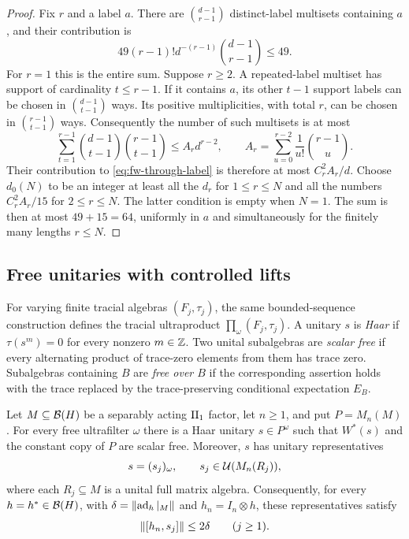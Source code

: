 \begin{proof}
Fix $r$ and a label $a$.  There are $\binom{d-1}{r-1}$ distinct-label
multisets containing $a$, and their contribution is
\[
 49(r-1)!d^{-(r-1)}\binom{d-1}{r-1}\leq49.
\]
For $r=1$ this is the entire sum.  Suppose $r\geq2$.  A repeated-label
multiset has support of cardinality $t\leq r-1$.  If it contains
$a$, its other $t-1$ support labels can be chosen in
$\binom{d-1}{t-1}$ ways.  Its positive multiplicities, with total
$r$, can be chosen in $\binom{r-1}{t-1}$ ways.  Consequently the
number of such multisets is at most
\[
 \sum_{t=1}^{r-1}\binom{d-1}{t-1}\binom{r-1}{t-1}
 \leq A_r d^{r-2},
 \qquad
 A_r=\sum_{u=0}^{r-2}\frac1{u!}\binom{r-1}{u}.
\]
Their contribution to \eqref{eq:fw-through-label} is therefore at
most $C_r^2 A_r/d$.  Choose $d_0(N)$ to be an integer at least all
the $d_r$ for $1\leq r\leq N$ and all the numbers
$C_r^2A_r/15$ for $2\leq r\leq N$.  The latter condition is empty
when $N=1$.  The sum is then at most $49+15=64$, uniformly in $a$
and simultaneously for the finitely many lengths $r\leq N$.
\end{proof}

\subsection{Free unitaries with controlled lifts}

For varying finite tracial algebras $(F_j,\tau_j)$, the same bounded-sequence construction defines the tracial ultraproduct $\prod_\omega(F_j,\tau_j)$.
A unitary $s$ is \emph{Haar} if $\tau(s^m)=0$ for every nonzero
$m\in\mathbb Z$.  Two unital subalgebras are \emph{scalar free} if every
alternating product of trace-zero elements from them has trace zero.
Subalgebras containing $B$ are \emph{free over $B$} if the corresponding
assertion holds with the trace replaced by the trace-preserving
conditional expectation $E_B$.

\begin{lemma}
\label{lem:free-lifts}
Let $M\subseteq\mathcal B(H)$ be a separably acting $\mathrm{II}_1$ factor, let
$n\geq1$, and put $P=M_n(M)$.  For every free ultrafilter $\omega$
there is a Haar unitary $s\in P^\omega$ such that $W^*(s)$ and the
constant copy of $P$ are scalar free.  Moreover, $s$ has unitary
representatives
\[
 s=(s_j)_\omega,\qquad
 s_j\in\mathcal U(M_n(R_j)),
\]
where each $R_j\subseteq M$ is a unital full matrix algebra.
Consequently, for every $h=h^*\in\mathcal B(H)$, with
$\delta=\lVert\operatorname{ad}_h|_M\rVert$ and $h_n=I_n\otimes h$, these representatives
satisfy
\begin{equation}\label{eq:free-lift-commutator}
 \lVert[h_n,s_j]\rVert\leq2\delta\qquad(j\geq1).
\end{equation}
\end{lemma}

